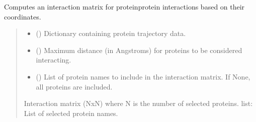 \documentclass[letterpaper,10pt,english]{sphinxmanual}
\begin{document}
\begin{fulllineitems}
\begin{fulllineitems}
\begin{quote}
\begin{description}
\end{description}\end{quote}

\end{fulllineitems}


\begin{fulllineitems}
\label{\detokenize{src:src.Analysis_Class.Analysis.calculate_interaction_matrix_no_grouping}}
\pysigstartsignatures
{}
\pysigstopsignatures
\sphinxAtStartPar
Computes an interaction matrix for protein\sphinxhyphen{}protein interactions based on their coordinates.
\begin{quote}\begin{description}
\begin{itemize}
\item {} 
\sphinxAtStartPar
{} () \textendash{} Dictionary containing protein trajectory data.

\item {} 
\sphinxAtStartPar
{} () \textendash{} Maximum distance (in Angstroms) for proteins to be considered interacting.

\item {} 
\sphinxAtStartPar
{} (\sphinxstyleliteralemphasis{\sphinxupquote{, }}) \textendash{} List of protein names to include in the interaction matrix.
If None, all proteins are included.

\end{itemize}

\sphinxAtStartPar
Interaction matrix (NxN) where N is the number of selected proteins.
list: List of selected protein names.


\end{description}
\end{quote}
\end{fulllineitems}
\end{fulllineitems}
\end{document}
